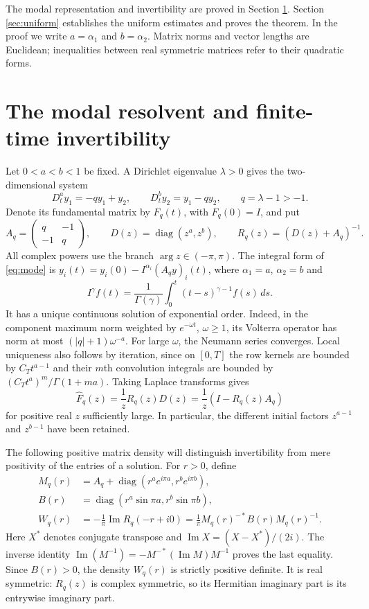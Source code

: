 \documentclass[11pt]{article}
\newcommand{\diag}{\operatorname{diag}}
\newcommand{\Id}{I}
\DeclareMathOperator{\Imat}{Im}
\begin{document}
The modal representation and invertibility are proved in Section
\ref{sec:modal}. Section \ref{sec:uniform} establishes the uniform estimates
and proves the theorem. In the proof we write $a=\alpha_1$ and
$b=\alpha_2$. Matrix norms and vector lengths are Euclidean; inequalities
between real symmetric matrices refer to their quadratic forms.


\section{The modal resolvent and finite-time invertibility}\label{sec:modal}
Let $0<a<b<1$ be fixed. A Dirichlet eigenvalue $\lambda>0$ gives the
two-dimensional system
\begin{equation}\label{eq:mode}
 D_t^a y_1=-qy_1+y_2,\qquad
 D_t^b y_2=y_1-qy_2,\qquad q=\lambda-1>-1.
\end{equation}
Denote its fundamental matrix by $F_q(t)$, with $F_q(0)=\Id$, and put
\[
 A_q=\begin{pmatrix}q&-1\\-1&q\end{pmatrix},\qquad
 D(z)=\diag(z^a,z^b),\qquad R_q(z)=(D(z)+A_q)^{-1}.
\]
All complex powers use the branch $\arg z\in(-\pi,\pi)$.
The integral form of \eqref{eq:mode} is
$y_i(t)=y_i(0)-I^{\alpha_i}(A_qy)_i(t)$, where
$\alpha_1=a$, $\alpha_2=b$ and
\[
 I^\gamma f(t)=\frac1{\Gamma(\gamma)}
       \int_0^t(t-s)^{\gamma-1}f(s)\,ds.
\]
It has a unique continuous solution of exponential order. Indeed, in the
component maximum norm weighted by $e^{-\omega t}$, $\omega\ge1$, its
Volterra operator has norm at most $(|q|+1)\omega^{-a}$.
For large $\omega$, the Neumann series converges. Local uniqueness also
follows by iteration, since on $[0,T]$ the row kernels are bounded by
$C_Tt^{a-1}$ and their $m$th convolution integrals are bounded by
$(C_Tt^a)^m/\Gamma(1+ma)$. Taking Laplace transforms gives
\begin{equation}\label{eq:Fhat}
 \widehat F_q(z)=\frac1zR_q(z)D(z)
               =\frac1z(\Id-R_q(z)A_q)
\end{equation}
for positive real $z$ sufficiently large. In particular, the different
initial factors $z^{a-1}$ and $z^{b-1}$ have been retained.

The following positive matrix density will distinguish invertibility from
mere positivity of the entries of a solution.
For $r>0$, define
\begin{align*}
 M_q(r)&=A_q+\diag(r^ae^{i\pi a},r^be^{i\pi b}),\\
 B(r)&=\diag(r^a\sin\pi a,r^b\sin\pi b),\\
 W_q(r)&=-\frac1\pi\Imat R_q(-r+i0)
       =\frac1\pi M_q(r)^{-*}B(r)M_q(r)^{-1}.
\end{align*}
Here $X^*$ denotes conjugate transpose and $\Imat X=(X-X^*)/(2i)$.
The inverse identity $\Imat(M^{-1})=-M^{-*}(\Imat M)M^{-1}$ proves the
last equality. Since $B(r)>0$, the density $W_q(r)$ is strictly positive
definite. It is real symmetric: $R_q(z)$ is complex symmetric, so its
Hermitian imaginary part is its entrywise imaginary part.
\end{document}
